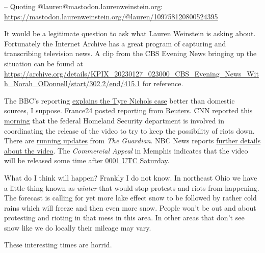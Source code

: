 -- Quoting @lauren@mastodon.laurenweinstein.org:
\url{https://mastodon.laurenweinstein.org/@lauren/109758120800524395}

It would be a legitimate question to ask what Lauren Weinstein is asking
about. Fortunately the Internet Archive has a great program of capturing
and transcribing television news. A clip from the CBS Evening News
bringing up the situation can be found at
\url{https://archive.org/details/KPIX_20230127_023000_CBS_Evening_News_With_Norah_ODonnell/start/302.2/end/415.1}
for reference.

The BBC's reporting
\href{https://web.archive.org/web/20230127052428/https://www.bbc.com/news/world-us-canada-64421704?at_medium=RSS&at_campaign=KARANGA}{explains
the Tyre Nichols case} better than domestic sources, I suppose. France24
\href{https://web.archive.org/web/20230127052758/https://www.france24.com/en/americas/20230126-former-memphis-police-officers-charged-with-murder-in-death-of-tyre-nichols}{posted
reporting from Reuters}. CNN reported
\href{https://www.cnn.com/us/live-news/tyre-nichols-memphis-news-1-27-23/h_e55bd61198d16d5972116361049c704a}{this
morning} that the federal Homeland Security department is involved in
coordinating the release of the video to try to keep the possibility of
riots down. There are
\href{https://www.theguardian.com/us-news/live/2023/jan/27/biden-tyre-nichols-police-video-rnc-politics-latest-updates}{running
updates} from \emph{The Guardian}. NBC News reports
\href{https://www.nbcnews.com/news/nbcblk/memphis-police-set-release-video-showing-fatal-beating-tyre-nichols-rcna67710}{further
details about the video}. The \emph{Commercial Appeal} in Memphis
indicates that the video will be released some time after
\href{https://www.commercialappeal.com/story/news/local/2023/01/26/tyre-nichols-video-to-be-released-after-6-p-m-friday/69844967007/}{0001
UTC Saturday}.

What do I think will happen? Frankly I do not know. In northeast Ohio we
have a little thing known as \emph{winter} that would stop protests and
riots from happening. The forecast is calling for yet more lake effect
snow to be followed by rather cold rains which will freeze and then even
more snow. People won't be out and about protesting and rioting in that
mess in this area. In other areas that don't see snow like we do locally
their mileage may vary.

These interesting times are horrid.

